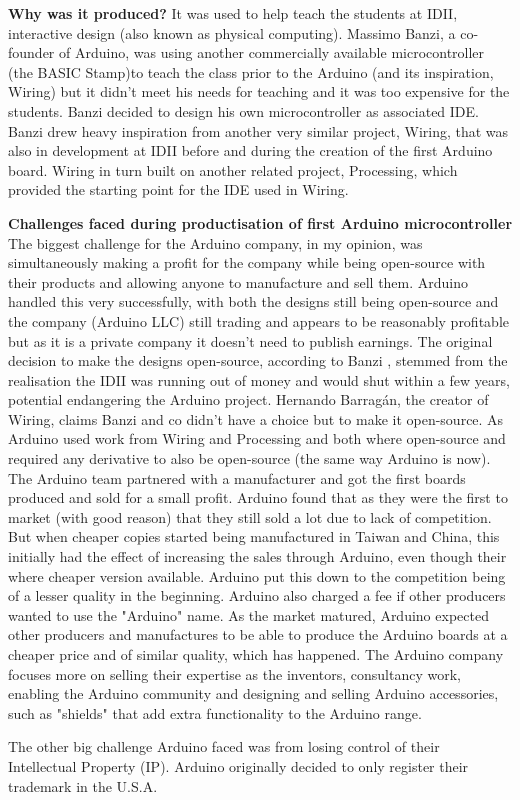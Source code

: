 \textbf{Why was it produced?}
It was used to help teach the students at IDII, interactive design (also known as physical computing). Massimo Banzi, a co-founder of Arduino, was using another commercially available microcontroller (the BASIC Stamp)to teach the class prior to the Arduino (and its inspiration, Wiring) but it didn't meet his needs for teaching and it was too expensive for the students. Banzi decided to design his own microcontroller as associated IDE. Banzi drew heavy inspiration from another very similar project, Wiring, that was also in development at IDII before and during the creation of the first Arduino board. Wiring in turn built on another related project, Processing, which provided the starting point for the IDE used in Wiring. 

\textbf{Challenges faced during productisation of first Arduino microcontroller}
The biggest challenge for the Arduino company, in my opinion, was simultaneously making a profit for the company while being open-source with their products and allowing anyone to manufacture and sell them. Arduino handled this very successfully, with both the designs still being open-source and the company (Arduino LLC) still trading and appears to be reasonably profitable but as it is a private company it doesn't need to publish earnings. The original decision to make the designs open-source, according to Banzi 
\cite{RN103}, stemmed from the realisation the IDII was running out of money and would shut within a few years, potential endangering the Arduino project. Hernando Barragán, the creator of Wiring, claims Banzi and co didn't have a choice but to make it open-source. As Arduino used work from Wiring and Processing and both where open-source and required any derivative to also be open-source (the same way Arduino is now). 
The Arduino team partnered with a manufacturer and got the first boards produced and sold for a small profit. Arduino found that as they were the first to market (with good reason) that they still sold a lot due to lack of competition. But when cheaper copies started being manufactured in Taiwan and China, this initially had the effect of increasing the sales through Arduino, even though their where cheaper version available. Arduino put this down to the competition being of a lesser quality in the beginning. Arduino also charged a fee if other producers wanted to use the "Arduino" name. As the market matured, Arduino expected other producers and manufactures to be able to produce the Arduino boards at a cheaper price and of similar quality, which has happened. The Arduino company focuses more on selling their expertise as the inventors, consultancy work, enabling the Arduino community and designing and selling Arduino accessories, such as "shields" that add extra functionality to the Arduino range.

The other big challenge Arduino faced was from losing control of their Intellectual Property (IP). Arduino originally decided to only register their trademark in the U.S.A. 